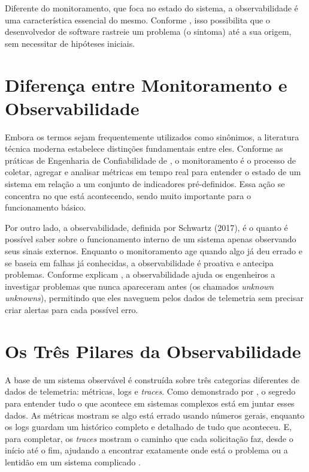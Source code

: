 \documentclass[
    12pt
    ,oneside
    ,a4paper
    ,chapter=TITLE
    ,section=TITLE
    ,sumario=abnt-6027-2012]{abntex2}
\begin{document}
Diferente do monitoramento, que foca no estado do sistema, a observabilidade é uma característica essencial do mesmo. Conforme , isso possibilita que o desenvolvedor de software rastreie um problema (o sintoma) até a sua origem, sem necessitar de hipóteses iniciais.

\section{Diferença entre Monitoramento e Observabilidade}

Embora os termos sejam frequentemente utilizados como sinônimos, a literatura técnica moderna estabelece distinções fundamentais entre eles. Conforme as práticas de Engenharia de Confiabilidade de , o monitoramento é o processo de coletar, agregar e analisar métricas em tempo real para entender o estado de um sistema em relação a um conjunto de indicadores pré-definidos. Essa ação se concentra no que está acontecendo, sendo muito importante para o funcionamento básico.

Por outro lado, a observabilidade, definida por Schwartz (2017), é o quanto é possível saber sobre o funcionamento interno de um sistema apenas observando seus sinais externos. Enquanto o monitoramento age quando algo já deu errado e se baseia em falhas já conhecidas, a observabilidade é proativa e antecipa problemas. Conforme explicam , a observabilidade ajuda os engenheiros a investigar problemas que nunca apareceram antes (os chamados \textit{unknown unknowns}), permitindo que eles naveguem pelos dados de telemetria sem precisar criar alertas para cada possível erro.

\section{Os Três Pilares da Observabilidade}

A base de um sistema observável é construída sobre três categorias diferentes de dados de telemetria: métricas, logs e \textit{traces}. Como demonstrado por , o segredo para entender tudo o que acontece em sistemas complexos está em juntar esses dados. As métricas mostram se algo está errado usando números gerais, enquanto os logs guardam um histórico completo e detalhado de tudo que aconteceu. E, para completar, os \textit{traces} mostram o caminho que cada solicitação faz, desde o início até o fim, ajudando a encontrar exatamente onde está o problema ou a lentidão em um sistema complicado \cite{majors2022observability}.
\end{document}
